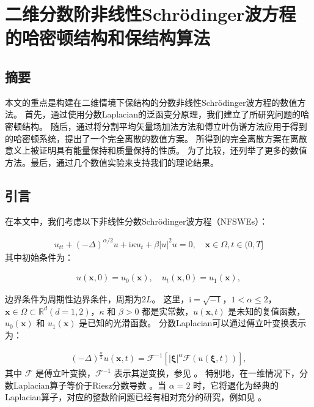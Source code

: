 \chapter[二维分数阶非线性Schr{\"o}dinger波方程的哈密顿结构和保结构算法]{二维分数阶非线性Schr{\"o}dinger波方程的哈密顿结构和保结构算法}

\section*{摘要}

本文的重点是构建在二维情境下保结构的分数非线性Schr{\"o}dinger波方程的数值方法。
首先，通过使用分数Laplacian的泛函变分原理，我们建立了所研究问题的哈密顿结构。
随后，通过将分割平均矢量场加法方法和傅立叶伪谱方法应用于得到的哈密顿系统，提出了一个完全离散的数值方案。
所得到的完全离散方案在离散意义上被证明具有能量保持和质量保持的性质。
为了比较，还列举了更多的数值方法。最后，通过几个数值实验来支持我们的理论结果。

\section{引言}\label{Section 1}

在本文中，我们考虑以下非线性分数Schr{\"o}dinger波方程（NFSWEs）：

\begin{align}\label{eq_1}
u_{t t}+(-\Delta)^{\alpha / 2} u+\mathrm{i} \kappa u_{t}+\beta|u|^{2} u=0, \quad \boldsymbol{x} \in \Omega, t \in(0, T]
\end{align}
其中初始条件为：

\begin{align}\label{eq_3}
u(\boldsymbol{x}, 0)=u_{0}(\boldsymbol{x}), \quad u_{t}(\boldsymbol{x}, 0)=u_{1}(\boldsymbol{x}),
\end{align}

边界条件为周期性边界条件，周期为$2L$。
这里，$\mathrm{i}=\sqrt{-1}$，$1<\alpha \leq 2$，$\boldsymbol{x}\in \Omega \subset \mathbb{R}^d ( d=1,2)$，$\kappa$ 和 $\beta>0$ 都是实常数，$u(\boldsymbol{x}, t)$ 是未知的复值函数，$u_{0}(\boldsymbol{x})$ 和 $u_{1}(\boldsymbol{x})$ 是已知的光滑函数。
分数Laplacian可以通过傅立叶变换表示为：

\begin{align}\label{eq_4}
	(-\Delta)^{\frac{\alpha}{2}} u(\boldsymbol{x},t)=\mathcal{F}^{-1}\left[|\boldsymbol{\xi}|^{\alpha} \mathcal{F}(u(\boldsymbol{\xi},t))\right],
	\end{align}
其中 $\mathcal{F}$ 是傅立叶变换，$\mathcal{F}^{-1}$ 表示其逆变换，参见 \cite{caffarelliExtensionProblemRelated2007}。
特别地，在一维情况下，分数Laplacian算子等价于Riesz分数导数 \cite{yangNumericalMethodsFractional2010,demengelFunctionalSpacesTheory2012}。当 $\alpha=2$ 时，它将退化为经典的Laplacian算子，对应的整数阶问题已经有相对充分的研究，例如见 \cite{zhangConservativeNumericalScheme2003,baoUniformErrorEstimates2012,chengSeveralConservativeCompact2018,brugnanoClassEnergyconservingHamiltonian2018}。

